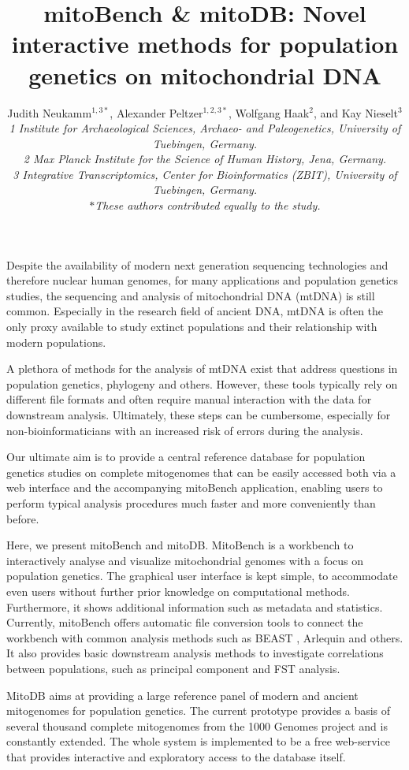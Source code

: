 \documentclass[english]{gcb17abstract}
\title{mitoBench \& mitoDB: Novel interactive methods for population genetics on mitochondrial DNA}
\author{
Judith Neukamm$^{1,3*}$, Alexander Peltzer$^{1,2,3*}$, Wolfgang Haak$^{2}$, and Kay Nieselt$^{3}$\\ \bigskip
{\normalsize\normalfont\itshape 1 Institute for Archaeological Sciences, Archaeo- and Paleogenetics, University of Tuebingen, Germany. \\2 Max Planck Institute for the Science of Human History, Jena, Germany. \\3 Integrative Transcriptomics, Center for Bioinformatics (ZBIT), University of Tuebingen, Germany. \\$*$These authors contributed equally to the study.}
}
\begin{document}
\maketitle 

Despite the availability of modern next generation sequencing technologies and therefore nuclear human genomes, for many applications and population genetics studies, the sequencing and analysis of mitochondrial DNA (mtDNA) is still common. Especially in the research field of ancient DNA, mtDNA is often the only proxy available to study extinct populations and their relationship with modern populations. 

A plethora of methods for the analysis of mtDNA exist that address questions in population genetics, phylogeny and others. However, these tools typically rely on different file formats and often require manual interaction with the data for downstream analysis. Ultimately, these steps can be cumbersome, especially for non-bioinformaticians with an increased risk of errors during the analysis. 

Our ultimate aim is to provide a central reference database for population genetics studies on complete mitogenomes that can be easily accessed both via a web interface and the accompanying mitoBench application, enabling users to perform typical analysis procedures much faster and more conveniently than before.

Here, we present mitoBench and mitoDB. MitoBench is a workbench to interactively analyse and visualize mitochondrial genomes with a focus on population genetics. The graphical user interface is kept simple, to accommodate even users without further prior knowledge on computational methods. Furthermore, it shows additional information such as metadata and statistics. Currently, mitoBench offers automatic file conversion tools to connect the workbench with common analysis methods such as BEAST \cite{bouckaert2014beast}, Arlequin \cite{excoffier2005arlequin} and others. It also provides basic downstream analysis methods to investigate correlations between populations, such as principal component and FST analysis.

MitoDB aims at providing a large reference panel of modern and ancient mitogenomes for population genetics. The current prototype provides a basis of several thousand complete mitogenomes from the 1000 Genomes project \cite{10002015global} and is constantly extended. The whole system is implemented to be a free web-service that provides interactive and exploratory access to the database itself. 
 


\end{document}
